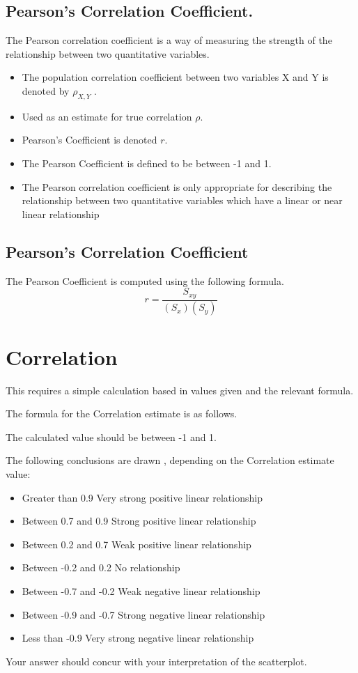 \documentclass[]{report}
\begin{document}
\subsection{Pearson's Correlation Coefficient.}

The Pearson correlation coefficient is a way of measuring the
strength of the relationship between two quantitative variables.

\begin{itemize}
	\item The population correlation coefficient between two variables X and
	Y is denoted by $\rho_{X,Y}$ .
	\item Used as an estimate for true correlation $\rho$.
	\item Pearson's Coefficient is denoted $r$.
	\item The Pearson Coefficient is defined to be between -1 and 1.
	\item The Pearson correlation coefficient is only appropriate for
	describing the relationship between two quantitative variables
	which have a linear or near linear relationship
\end{itemize}


\subsection{Pearson's Correlation Coefficient}
The Pearson Coefficient is computed using the following formula.
\[ r = \frac{S_{xy}}{(S_x)(S_y)} \]


\section{Correlation}

This requires a simple calculation based in values given and the relevant formula.

The formula for the Correlation estimate is as follows.

The calculated value should be between -1 and 1.

The following conclusions are drawn , depending on the Correlation estimate value:
\begin{itemize}
	\item Greater than 0.9 		Very strong positive linear relationship 
	\item Between 0.7 and 0.9		Strong positive linear relationship 
	\item Between 0.2 and 0.7	 	Weak positive linear relationship
	\item Between -0.2 and 0.2		No relationship
	\item Between -0.7 and -0.2		Weak negative linear relationship
	\item Between -0.9 and -0.7		Strong negative linear relationship
	\item Less than -0.9			Very strong negative linear relationship
\end{itemize}
Your answer should concur with your interpretation of the scatterplot.
\end{document}
